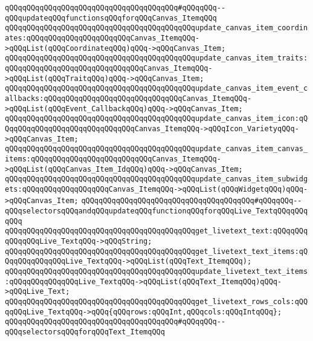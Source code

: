 \verb|qQQqqQQqqQQqqQQqqQQqqQQqqQQqqQQqqQQqqQQq#qQQqqQQq--qQQqupdateqQQqfunctionsqQQqforqQQqCanvas_ItemqQQq|\newline
\verb|qQQqqQQqqQQqqQQqqQQqqQQqqQQqqQQqqQQqqQQqqQQqupdate_canvas_item_coordinates:qQQqqQQqqQQqqQQqqQQqqQQqCanvas_ItemqQQq->qQQqList(qQQqCoordinateqQQq)qQQq->qQQqCanvas_Item;|\newline
\verb|qQQqqQQqqQQqqQQqqQQqqQQqqQQqqQQqqQQqqQQqqQQqupdate_canvas_item_traits:qQQqqQQqqQQqqQQqqQQqqQQqqQQqqQQqCanvas_ItemqQQq->qQQqList(qQQqTraitqQQq)qQQq->qQQqCanvas_Item;|\newline
\verb|qQQqqQQqqQQqqQQqqQQqqQQqqQQqqQQqqQQqqQQqqQQqupdate_canvas_item_event_callbacks:qQQqqQQqqQQqqQQqqQQqqQQqqQQqqQQqCanvas_ItemqQQq->qQQqList(qQQqEvent_CallbackqQQq)qQQq->qQQqCanvas_Item;|\newline
\newline
\verb|qQQqqQQqqQQqqQQqqQQqqQQqqQQqqQQqqQQqqQQqqQQqupdate_canvas_item_icon:qQQqqQQqqQQqqQQqqQQqqQQqqQQqqQQqCanvas_ItemqQQq->qQQqIcon_VarietyqQQq->qQQqCanvas_Item;|\newline
\verb|qQQqqQQqqQQqqQQqqQQqqQQqqQQqqQQqqQQqqQQqqQQqupdate_canvas_item_canvas_items:qQQqqQQqqQQqqQQqqQQqqQQqqQQqCanvas_ItemqQQq->qQQqList(qQQqCanvas_Item_IdqQQq)qQQq->qQQqCanvas_Item;|\newline
\verb|qQQqqQQqqQQqqQQqqQQqqQQqqQQqqQQqqQQqqQQqqQQqupdate_canvas_item_subwidgets:qQQqqQQqqQQqqQQqqQQqCanvas_ItemqQQq->qQQqList(qQQqWidgetqQQq)qQQq->qQQqCanvas_Item;|\newline
\newline
\verb|qQQqqQQqqQQqqQQqqQQqqQQqqQQqqQQqqQQqqQQq#qQQqqQQq--qQQqselectorsqQQqandqQQqupdateqQQqfunctionqQQqforqQQqLive_TextqQQqqQQqqQQq|\newline
\verb|qQQqqQQqqQQqqQQqqQQqqQQqqQQqqQQqqQQqqQQqqQQqget_livetext_text:qQQqqQQqqQQqqQQqLive_TextqQQq->qQQqString;|\newline
\verb|qQQqqQQqqQQqqQQqqQQqqQQqqQQqqQQqqQQqqQQqqQQqget_livetext_text_items:qQQqqQQqqQQqqQQqLive_TextqQQq->qQQqList(qQQqText_ItemqQQq);|\newline
\verb|qQQqqQQqqQQqqQQqqQQqqQQqqQQqqQQqqQQqqQQqqQQqupdate_livetext_text_items:qQQqqQQqqQQqqQQqLive_TextqQQq->qQQqList(qQQqText_ItemqQQq)qQQq->qQQqLive_Text;|\newline
\verb|qQQqqQQqqQQqqQQqqQQqqQQqqQQqqQQqqQQqqQQqqQQqget_livetext_rows_cols:qQQqqQQqLive_TextqQQq->qQQq{qQQqrows:qQQqInt,qQQqcols:qQQqIntqQQq};|\newline
\newline
\verb|qQQqqQQqqQQqqQQqqQQqqQQqqQQqqQQqqQQqqQQq#qQQqqQQq--qQQqselectorsqQQqforqQQqText_ItemqQQq|\newline
